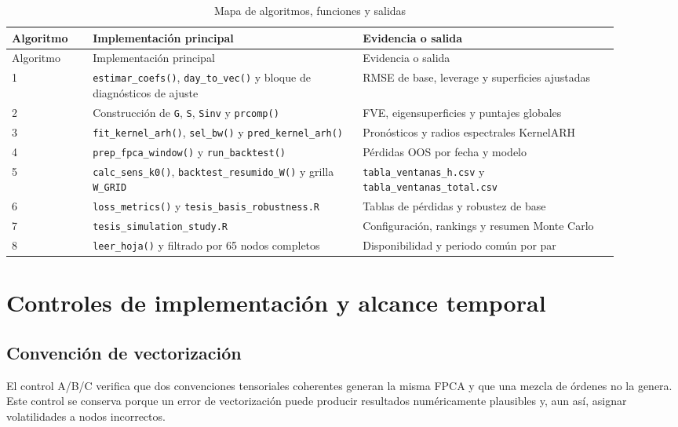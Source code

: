 \documentclass[a4paper,11pt]{article}
\begin{document}
\begin{longtable}{p{0.12\linewidth}p{0.40\linewidth}p{0.38\linewidth}}
\caption{Mapa de algoritmos, funciones y salidas}
\label{tab:algorithm_code_map}\\
\toprule
Algoritmo & Implementación principal & Evidencia o salida \\
\midrule
\endfirsthead
\toprule
Algoritmo & Implementación principal & Evidencia o salida \\
\midrule
\endhead
1 & \texttt{estimar\_coefs()}, \texttt{day\_to\_vec()} y bloque de diagnósticos de ajuste & RMSE de base, leverage y superficies ajustadas \\
2 & Construcción de \texttt{G}, \texttt{S}, \texttt{Sinv} y \texttt{prcomp()} & FVE, eigensuperficies y puntajes globales \\
3 & \texttt{fit\_kernel\_arh()}, \texttt{sel\_bw()} y \texttt{pred\_kernel\_arh()} & Pronósticos y radios espectrales KernelARH \\
4 & \texttt{prep\_fpca\_window()} y \texttt{run\_backtest()} & Pérdidas OOS por fecha y modelo \\
5 & \texttt{calc\_sens\_k0()}, \texttt{backtest\_resumido\_W()} y grilla \texttt{W\_GRID} & \texttt{tabla\_ventanas\_h.csv} y \texttt{tabla\_ventanas\_total.csv} \\
6 & \texttt{loss\_metrics()} y \texttt{tesis\_basis\_robustness.R} & Tablas de pérdidas y robustez de base \\
7 & \texttt{tesis\_simulation\_study.R} & Configuración, rankings y resumen Monte Carlo \\
8 & \texttt{leer\_hoja()} y filtrado por 65 nodos completos & Disponibilidad y periodo común por par \\
\bottomrule
\end{longtable}

\section{Controles de implementación y alcance temporal}

\subsection{Convención de vectorización}

El control A/B/C verifica que dos convenciones tensoriales coherentes generan la misma FPCA y que una mezcla de órdenes no la genera. Este control se conserva porque un error de vectorización puede producir resultados numéricamente plausibles y, aun así, asignar volatilidades a nodos incorrectos.
\end{document}
